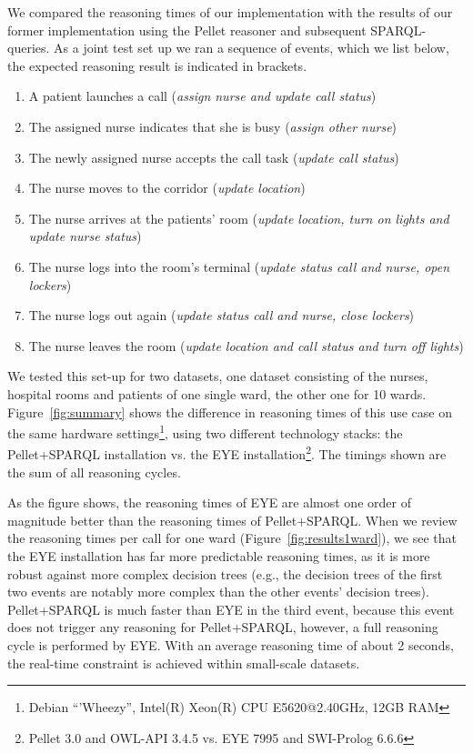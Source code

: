 We compared the reasoning times of our implementation with the results of our former implementation using 
the Pellet reasoner and subsequent SPARQL-queries. 
As a joint test set up we ran a sequence of events, which we list below, the expected reasoning result is indicated in brackets. 

\begin{enumerate}
\item %
A patient launches a call (\emph{assign nurse and update call status})
\item
The assigned nurse indicates that she is busy (\emph{assign other nurse})
\item
The newly assigned nurse accepts the call task (\emph{update call status})
\item %
The nurse moves to the corridor (\emph{update location})
\item %
The nurse arrives at the patients' room (\emph{update location, turn on lights  and update nurse status})
\item %
The nurse logs into the room's terminal (\emph{update status call and nurse, open lockers})
\item %
The nurse logs out again (\emph{update status call and nurse, close lockers})
\item %
The nurse leaves the room (\emph{update location and call status and turn off lights})
\end{enumerate}

We tested this set-up for two datasets, one dataset consisting of the nurses, hospital rooms and patients of one single ward, the other one for 10 wards.
Figure~\ref{fig:summary} shows the difference in reasoning times of this use case on the same hardware settings\footnote{Debian ``'Wheezy'', Intel(R) Xeon(R) CPU E5620@2.40GHz, 12GB RAM}, using two different technology stacks: the Pellet+SPARQL installation vs. the EYE installation\footnote{Pellet 3.0 and OWL-API 3.4.5 vs. EYE 7995 and SWI-Prolog 6.6.6}.
The timings shown are the sum of all reasoning cycles.

As the figure shows, the reasoning times of EYE are almost one order of magnitude better than the reasoning times of Pellet+SPARQL. 
When we review the reasoning times per call for one ward (Figure~\ref{fig:results1ward}), we see that the EYE installation has far 
more predictable reasoning times, as it is more robust against more complex decision trees
(e.g., the decision trees of the first two events are notably more complex than the other events' decision trees).
Pellet+SPARQL is much faster than EYE in the third event, because this event does not trigger any reasoning for Pellet+SPARQL, however, 
a full reasoning cycle is performed by EYE. 
With an average reasoning time of about 2 seconds, the real-time constraint is achieved within small-scale datasets.

